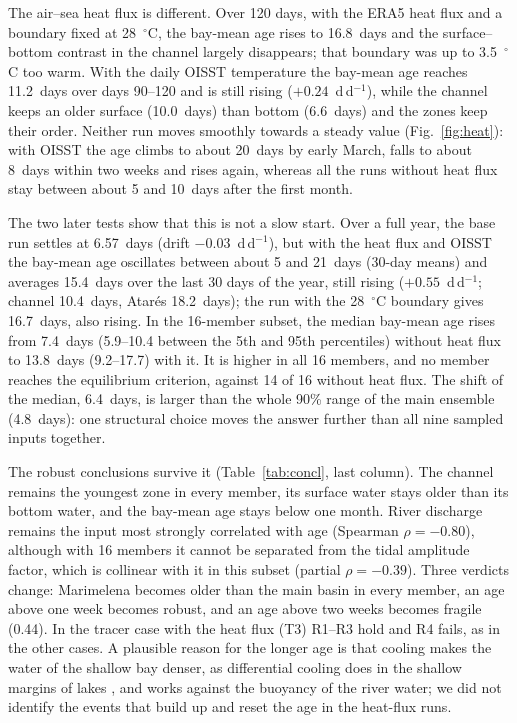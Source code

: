 \documentclass[a4paper,fleqn]{ems-dc}
\begin{document}
The air--sea heat flux is different. Over 120 days, with the ERA5 heat flux and a boundary
fixed at 28~$^\circ$C, the bay-mean age rises to 16.8~days and the surface--bottom contrast
in the channel largely disappears; that boundary was up to 3.5~$^\circ$C too warm. With the
daily OISST temperature the bay-mean age reaches 11.2~days over days 90--120 and is still
rising ($+0.24$~d\,d$^{-1}$), while the channel keeps an older surface (10.0~days) than
bottom (6.6~days) and the zones keep their order. Neither run moves smoothly towards a steady
value (Fig.~\ref{fig:heat}): with OISST the age climbs to about 20~days by early March,
falls to about 8~days within two weeks and rises again, whereas all the runs without heat
flux stay between about 5 and 10~days after the first month.

The two later tests show that this is not a slow start. Over a full year, the base run
settles at 6.57~days (drift $-0.03$~d\,d$^{-1}$), but with the heat flux and OISST the
bay-mean age oscillates between about 5 and 21~days (30-day means) and averages 15.4~days
over the last 30 days of the year, still rising ($+0.55$~d\,d$^{-1}$; channel 10.4~days,
Atar\'es 18.2~days); the run with the 28~$^\circ$C boundary gives 16.7~days, also rising.
In the 16-member subset, the median bay-mean age rises from 7.4~days (5.9--10.4 between the
5th and 95th percentiles) without heat flux to 13.8~days (9.2--17.7) with it. It is higher
in all 16 members, and no member reaches the equilibrium criterion, against 14 of 16 without
heat flux. The shift of the median, 6.4~days, is larger than the whole 90\% range of the
main ensemble (4.8~days): one structural choice moves the answer further than all nine
sampled inputs together.

The robust conclusions survive it (Table~\ref{tab:concl}, last column). The channel remains
the youngest zone in every member, its surface water stays older than its bottom water, and
the bay-mean age stays below one month. River discharge remains the input most strongly
correlated with age (Spearman $\rho = -0.80$), although with 16 members it cannot be
separated from the tidal amplitude factor, which is collinear with it in this subset
(partial $\rho = -0.39$). Three verdicts change: Marimelena becomes older than the main basin
in every member, an age above one week becomes robust, and an age above two weeks becomes
fragile (0.44). In the tracer case with the heat flux (T3) R1--R3 hold and R4 fails, as in
the other cases. A plausible reason for the longer age is that cooling makes the water of
the shallow bay denser, as differential cooling does in the shallow margins of lakes
\citep{Doda2022}, and works against the buoyancy of the river water; we did not identify the
events that build up and reset the age in the heat-flux runs.
\end{document}
